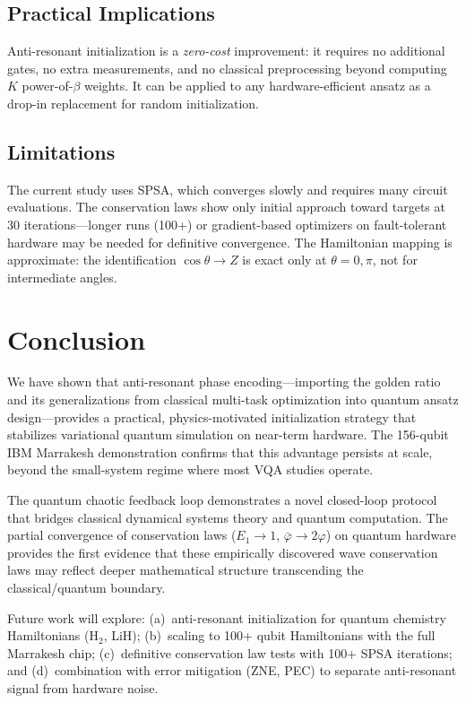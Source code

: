 \documentclass[twocolumn,showpacs,preprintnumbers,amsmath,amssymb,aps,prl]{revtex4-2}
\begin{document}
\subsection{Practical Implications}

Anti-resonant initialization is a \emph{zero-cost} improvement: it requires no additional gates, no extra measurements, and no classical preprocessing beyond computing $K$ power-of-$\beta$ weights. It can be applied to any hardware-efficient ansatz as a drop-in replacement for random initialization.

\subsection{Limitations}

The current study uses SPSA, which converges slowly and requires many circuit evaluations. The conservation laws show only initial approach toward targets at 30 iterations---longer runs (100+) or gradient-based optimizers on fault-tolerant hardware may be needed for definitive convergence. The Hamiltonian mapping is approximate: the identification $\cos\theta \to Z$ is exact only at $\theta = 0, \pi$, not for intermediate angles.


\section{Conclusion}
\label{sec:conclusion}

We have shown that anti-resonant phase encoding---importing the golden ratio and its generalizations from classical multi-task optimization into quantum ansatz design---provides a practical, physics-motivated initialization strategy that stabilizes variational quantum simulation on near-term hardware. The 156-qubit IBM Marrakesh demonstration confirms that this advantage persists at scale, beyond the small-system regime where most VQA studies operate.

The quantum chaotic feedback loop demonstrates a novel closed-loop protocol that bridges classical dynamical systems theory and quantum computation. The partial convergence of conservation laws ($E_1 \to 1$, $\bar{\varphi} \to 2\varphi$) on quantum hardware provides the first evidence that these empirically discovered wave conservation laws may reflect deeper mathematical structure transcending the classical/quantum boundary.

Future work will explore: (a)~anti-resonant initialization for quantum chemistry Hamiltonians (H$_2$, LiH); (b)~scaling to 100+ qubit Hamiltonians with the full Marrakesh chip; (c)~definitive conservation law tests with 100+ SPSA iterations; and (d)~combination with error mitigation (ZNE, PEC) to separate anti-resonant signal from hardware noise.
\end{document}
